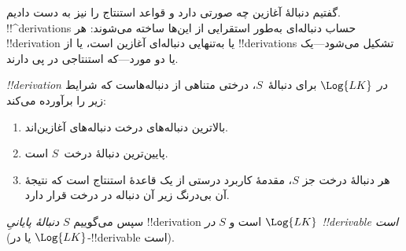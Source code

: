 \documentclass[../../../include/open-logic-section]{subfiles}
\begin{document}
      {}
      {}


\begin{explain}
گفتیم دنبالهٔ آغازین چه صورتی دارد و قواعد استنتاج را نیز به دست دادیم.
!!^{derivation}s حساب دنباله‌ای به‌طور استقرایی از این‌ها ساخته می‌شوند:
هر !!{derivation} یا به‌تنهایی دنباله‌ای آغازین است، یا از
!!{derivation}s تشکیل می‌شود---یک یا دو مورد---که استنتاجی در پی دارند.
\end{explain}

\begin{defn}
\emph{!!{derivation} در $\Log{LK}$} برای دنبالهٔ~$S$، درختی متناهی
از دنباله‌هاست که شرایط زیر را برآورده می‌کند:
\begin{enumerate}
\item بالاترین دنباله‌های درخت دنباله‌های آغازین‌اند.
\item پایین‌ترین دنبالهٔ درخت~$S$ است.
\item هر دنبالهٔ درخت جز $S$، مقدمهٔ کاربرد درستی از یک قاعدهٔ استنتاج
  است که نتیجهٔ آن بی‌درنگ زیر آن دنباله در درخت قرار دارد.
\end{enumerate}
سپس می‌گوییم $S$ \emph{دنبالهٔ پایانیِ} !!{derivation} است و
$S$ \emph{در $\Log{LK}$ !!{derivable} است} (یا در
$\Log{LK}$-!!{derivable} است).
\end{defn}
\end{document}
